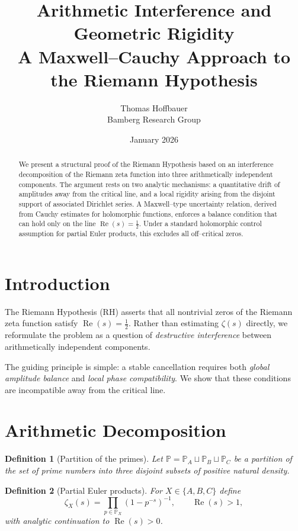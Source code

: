 \documentclass[11pt]{article}
\title{\textbf{Arithmetic Interference and Geometric Rigidity}\\
A Maxwell--Cauchy Approach to the Riemann Hypothesis}
\author{Thomas Hoffbauer\\
Bamberg Research Group}
\date{January 2026}
\newtheorem{definition}{Definition}
\newcommand{\Rea}{\operatorname{Re}}
\begin{document}
\maketitle

\begin{abstract}
We present a structural proof of the Riemann Hypothesis based on an interference
decomposition of the Riemann zeta function into three arithmetically independent
components. The argument rests on two analytic mechanisms: a quantitative drift
of amplitudes away from the critical line, and a local rigidity arising from the
disjoint support of associated Dirichlet series.
A Maxwell--type uncertainty relation, derived from Cauchy estimates for holomorphic
functions, enforces a balance condition that can hold only on the line
$\Rea(s)=\tfrac12$. Under a standard holomorphic control assumption for partial
Euler products, this excludes all off--critical zeros.
\end{abstract}

\tableofcontents

\section{Introduction}

The Riemann Hypothesis (RH) asserts that all nontrivial zeros of the Riemann zeta
function satisfy $\Rea(s)=\tfrac12$.
Rather than estimating $\zeta(s)$ directly, we reformulate the problem as a
question of \emph{destructive interference} between arithmetically independent
components.

The guiding principle is simple: a stable cancellation requires both
\emph{global amplitude balance} and \emph{local phase compatibility}. We show
that these conditions are incompatible away from the critical line.

\section{Arithmetic Decomposition}

\begin{definition}[Partition of the primes]
Let $\mathbb P=\mathbb P_A\sqcup\mathbb P_B\sqcup\mathbb P_C$ be a partition of the
set of prime numbers into three disjoint subsets of positive natural density.
\end{definition}

\begin{definition}[Partial Euler products]
For $X\in\{A,B,C\}$ define
\[
\zeta_X(s)=\prod_{p\in\mathbb P_X}(1-p^{-s})^{-1},
\qquad \Rea(s)>1,
\]
with analytic continuation to $\Rea(s)>0$.
\end{definition}
\end{document}
